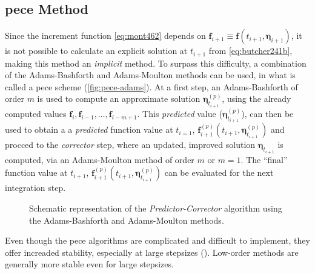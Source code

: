 \subsection{\gls{pece} Method}\label{ssec:predictor-corrector-method}

Since the increment function \autoref{eq:mont462} depends on 
$\bm{f}_{i+1} \equiv \bm{f}(t_{i+1}, \bm{\eta}_{i+1})$, it is not possible to 
calculate an explicit solution at $t_{i+1}$ from \autoref{eq:butcher241b}, 
making this method an \emph{implicit} method. To surpass this difficulty, a combination 
of the Adams-Bashforth and Adams-Moulton methods can be used, in what is called a 
\gls{pece} scheme (\autoref{fig:pece-adams}). 
At a first step, an Adams-Bashforth of order $m$ is used to compute an approximate 
solution $\bm{\eta}^{(p)}_{t_{i+1}}$, using the already computed values 
$\bm{f}_i, \bm{f}_{i-1}, \dots , \bm{f}_{i-m+1}$. This \emph{predicted} value 
($\bm{\eta}^{(p)}_{t_{i+1}}$), can then be used to obtain a a \emph{predicted} 
function value at $t_{i=1}$, $\bm{f}^{(p)}_{i+1}(t_{i+1},\bm{\eta}^{(p)}_{t_{i+1}})$ 
and procced to the \emph{corrector} step, where an updated, improved solution 
$\bm{\eta}_{t_{i+1}}$ is computed, via an Adams-Moulton method of order $m$ or 
$m=1$. The ``final'' function value at $t_{i+1}$, 
$\bm{f}^{(p)}_{i+1}(t_{i+1},\bm{\eta}^{(p)}_{t_{i+1}})$ can be evaluated for the 
next integration step.

\begin{figure}
    \centering
    
    \caption{Schematic representation of the \emph{Predictor-Corrector} algorithm using the Adams-Bashforth and Adams-Moulton methods.}
    \label{fig:pece-adams}
  \end{figure}

Even though the \gls{pece} algorithms are complicated and difficult to implement, 
they offer increaded stability, especially at large stepsizes (\cite{Montenbruck2000}).
Low-order methods are generally more stable even for large stepsizes.
